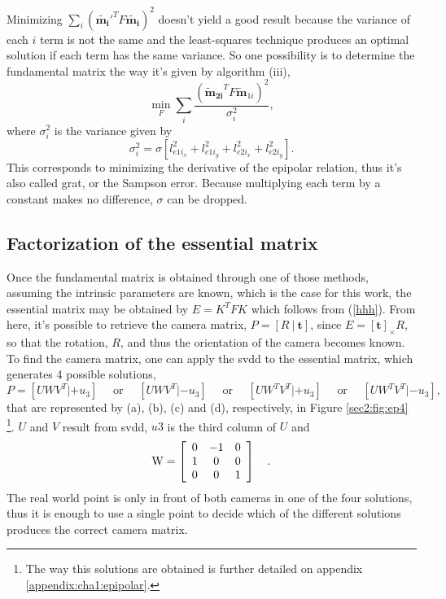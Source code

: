Minimizing $ \sum_i (\mathbf{\widetilde{m_i}}'^T F \mathbf{\widetilde{m_i}})^2$ doesn't yield a good result because the variance of each $i$ term is not the same and the least-squares technique produces an optimal solution if each term has the same variance. So one possibility is to determine the fundamental matrix the way it's given by algorithm (iii), 
\begin{equation}
\min_F \sum_i \frac{ (\mathbf{\widetilde{\mathbf{m}}_{2i}}^T F \widetilde{\mathbf{m}}_{1i})^2}{\sigma_i^2},
\end{equation}
where $\sigma_i^2$ is the variance given by 
\begin{equation}
\sigma_i^2 = \sigma [l_{{e1i}_x}^2 + l_{{e1i}_y}^2 + l_{{e2i}_x}^2 + l_{{e2i}_y}^2].
\end{equation}
This corresponds to minimizing the derivative of the epipolar relation, thus it's also called \acrfull{grat}, or the Sampson error.
Because multiplying each term by a constant makes no difference, $\sigma$ can be dropped. 

\subsection{Factorization of the essential matrix}
\label{cha2:epipolar:fact}
Once the fundamental matrix is obtained through one of those methods, assuming the intrinsic parameters are known, which is the case for this work, the essential matrix may be obtained by $E = K^{T}  F K$ which follows from (\ref{hhh}).
From here, it's possible to retrieve the camera matrix, $P = [R \ | \ \mathbf{t}]$, since $E = [\mathbf{t}]_\times R$, so that the rotation, $R$, and thus the orientation of the camera becomes known.
To find the camera matrix, one can apply the \acrshort{svdd} to the essential matrix, which generates 4 possible solutions,
\begin{equation}
P = \left[UWV^T | + u_{ 3 } \right] \quad \text { or } \quad \left[ UWV^T | - u_ { 3 } \right] \quad \text { or } \quad \left[ UW^T V^T | + u_ { 3 } \right] \quad \text { or } \quad \left[ UW^T V^T |- u _ { 3 } \right],
\end{equation}
that are represented by (a), (b), (c) and (d), respectively, in Figure \ref{sec2:fig:ep4} \footnote{The way this solutions are obtained is further detailed on appendix \ref{appendix:cha1:epipolar}.}. $U$ and $V$ result from \acrshort{svdd}, $u3$ is the third column of $U$ and 
\begin{equation}
	\mathrm { W } = \left[ \begin{array} { c c c } { 0 } & { - 1 } & { 0 } \\ { 1 } & { 0 } & { 0 } \\ { 0 } & { 0 } & { 1 } \end{array} \right] \quad.
\end{equation}
The real world point is only in front of both cameras in one of the four solutions, thus it is enough to use a single point to decide which of the different solutions produces the correct camera matrix. \cite{multiview}\\

